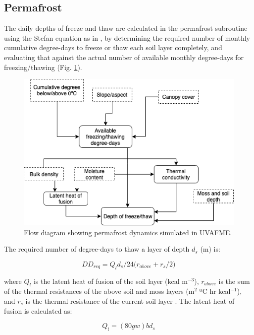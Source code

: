 \documentclass[a4paper, 12pt] {report}
\begin{document}
\subsection{Permafrost} \label{perm}

The daily depths of freeze and thaw are calculated in the permafrost subroutine using the Stefan equation as in , by determining the required number of monthly cumulative degree-days to freeze or thaw each soil layer completely, and evaluating that against the actual number of available monthly degree-days for freezing/thawing (Fig. \ref{fig:permdiagram}). 

\begin{figure}
  \includegraphics[width=\linewidth]{Figures/Permafrost.png}
  \caption{Flow diagram showing permafrost dynamics simulated in UVAFME.}
  \label{fig:permdiagram}
\end{figure}

The required number of degree-days to thaw a layer of depth $d_s$ (m) is:

\begin{equation}
DD_{req} = Q_ld_s/24\Big(r_{above} + r_s/2\Big)
\end{equation}

where $Q_l$ is the latent heat of fusion of the soil layer (kcal m$^{-3}$), $r_{above}$ is the sum of the thermal resistances of the above soil and moss layers (m$^2$ ºC hr kcal$^{-1}$), and $r_s$ is the thermal resistance of the current soil layer \cite{jumikisThermalSoilMechanics1966, bonanComputerModelSolar1989}. The latent heat of fusion is calculated as:

\begin{equation}
Q_l = (80gw)bd_s
\end{equation}
\end{document}
